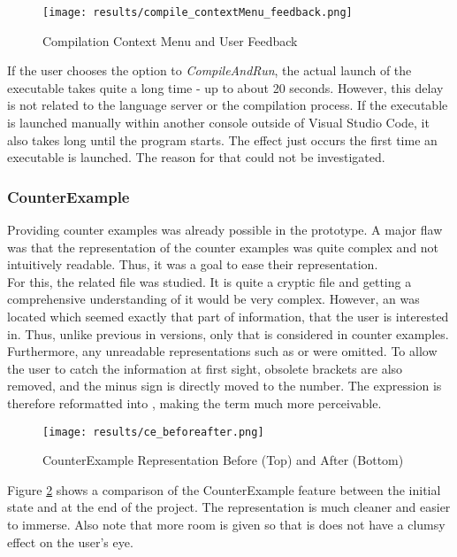 \begin{figure}[H]
    \centering
    \texttt{[image: results/compile\_contextMenu\_feedback.png]}
    \caption{Compilation Context Menu and User Feedback}
    \label{fig:compilation_stuff}
\end{figure}


If the user chooses the option to \textit{CompileAndRun}, the actual launch of the executable takes quite a long time - up to about 20 seconds.
However, this delay is not related to the language server or the compilation process.
If the executable is launched manually within another console outside of Visual Studio Code, it also takes long until the program starts.
The effect just occurs the first time an executable is launched.
The reason for that could not be investigated.

\subsubsection{CounterExample}
Providing counter examples was already possible in the prototype.
A major flaw was that the representation of the counter examples was quite complex and not intuitively readable.
Thus, it was a goal to ease their representation.\\

For this, the related  file was studied.
It is quite a  cryptic file and getting a comprehensive understanding of it would be very complex.
However, an  was located which seemed exactly that part of information, that the user is interested in.
Thus, unlike previous in versions, only that  is considered in counter examples.
Furthermore, any unreadable representations such as  or  were omitted.
To allow the user to catch the information at first sight, obsolete brackets are also removed, and the minus sign is directly moved to the number.
The expression  is therefore reformatted into , making the term much more perceivable.

\begin{figure}[H]
    \centering
    \texttt{[image: results/ce\_beforeafter.png]}
    \caption{CounterExample Representation Before (Top) and After (Bottom)}
    \label{fig:ce_beforeafter}
\end{figure}

Figure \ref{fig:ce_beforeafter} shows a comparison of the CounterExample feature between the initial state and at the end of the project.
The representation is much cleaner and easier to immerse.
Also note that more room is given so that is does not have a clumsy effect on the user's eye. \\

